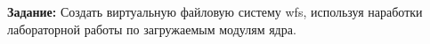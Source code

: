 \Introduction


\textbf{Задание:}
Создать виртуальную файловую систему wfs, используя наработки лабораторной
работы по загружаемым модулям ядра.
